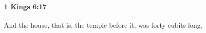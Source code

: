 
		\paragraph{1 Kings 6:17} %
			\label{1KINGS-6-17}

			And the house, that is, the temple before it, was forty cubits long.


